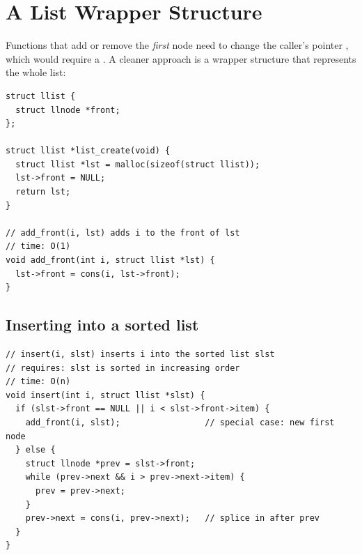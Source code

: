 \section{A List Wrapper Structure}

Functions that add or remove the \emph{first} node need to change the caller's pointer
, which would require a . A cleaner approach is a wrapper
structure that represents the whole list:
\begin{lstlisting}[style=c]
struct llist {
  struct llnode *front;
};

struct llist *list_create(void) {
  struct llist *lst = malloc(sizeof(struct llist));
  lst->front = NULL;
  return lst;
}

// add_front(i, lst) adds i to the front of lst
// time: O(1)
void add_front(int i, struct llist *lst) {
  lst->front = cons(i, lst->front);
}
\end{lstlisting}

\subsection{Inserting into a sorted list}
\begin{lstlisting}[style=c]
// insert(i, slst) inserts i into the sorted list slst
// requires: slst is sorted in increasing order
// time: O(n)
void insert(int i, struct llist *slst) {
  if (slst->front == NULL || i < slst->front->item) {
    add_front(i, slst);                 // special case: new first node
  } else {
    struct llnode *prev = slst->front;
    while (prev->next && i > prev->next->item) {
      prev = prev->next;
    }
    prev->next = cons(i, prev->next);   // splice in after prev
  }
}
\end{lstlisting}
\begin{center}
\end{center}

